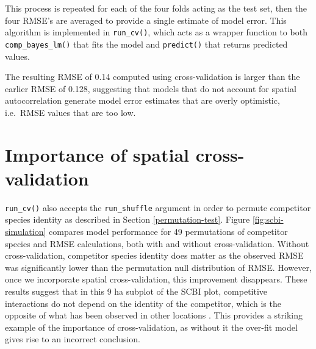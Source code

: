 \documentclass[12pt]{article}
\newenvironment{Shaded}{\begin{snugshade}}{\end{snugshade}}
\newcommand{\CommentTok}[1]{\textcolor[rgb]{0.56,0.35,0.01}{\textit{#1}}}
\newcommand{\DataTypeTok}[1]{\textcolor[rgb]{0.13,0.29,0.53}{#1}}
\newcommand{\KeywordTok}[1]{\textcolor[rgb]{0.13,0.29,0.53}{\textbf{#1}}}
\newcommand{\NormalTok}[1]{#1}
\newcommand{\OperatorTok}[1]{\textcolor[rgb]{0.81,0.36,0.00}{\textbf{#1}}}
\newcommand{\StringTok}[1]{\textcolor[rgb]{0.31,0.60,0.02}{#1}}
\begin{document}
This process is repeated for each of the four folds acting as the test
set, then the four RMSE's are averaged to provide a single estimate of
model error. This algorithm is implemented in \texttt{run\_cv()}, which
acts as a wrapper function to both \texttt{comp\_bayes\_lm()} that fits
the model and \texttt{predict()} that returns predicted values.

\begin{Shaded}
\end{Shaded}

\begin{Shaded}
\end{Shaded}

The resulting RMSE of 0.14 computed using cross-validation is larger
than the earlier RMSE of 0.128, suggesting that models that do not
account for spatial autocorrelation generate model error estimates that
are overly optimistic, i.e.~RMSE values that are too low.

\hypertarget{importance-of-spatial-cross-validation}{%
\section{Importance of spatial
cross-validation}\label{importance-of-spatial-cross-validation}}

\texttt{run\_cv()} also accepts the \texttt{run\_shuffle} argument in
order to permute competitor species identity as described in Section
\ref{permutation-test}. Figure \ref{fig:scbi-simulation} compares model
performance for 49 permutations of competitor species and RMSE
calculations, both with and without cross-validation. Without
cross-validation, competitor species identity does matter as the
observed RMSE was significantly lower than the permutation null
distribution of RMSE. However, once we incorporate spatial
cross-validation, this improvement disappears. These results suggest
that in this 9 ha subplot of the SCBI plot, competitive interactions do
not depend on the identity of the competitor, which is the opposite of
what has been observed in other locations \citep[
\citet{uriarte_spatially_2004}]{allen_permutation_2020}. This provides a
striking example of the importance of cross-validation, as without it
the over-fit model gives rise to an incorrect conclusion.
\end{document}
